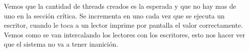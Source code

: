 Vemos que la cantidad de threads creados es la esperada y que no hay mas de uno en la sección crítica. Se incrementa en uno cada vez que se ejecuta
un escritor, cuando le toca a un lector imprime por pantalla el valor correctamente. Vemos como se van intercalando los lectores con los escritores, 
esto nos hacer ver que el sistema no va a tener inanición.

